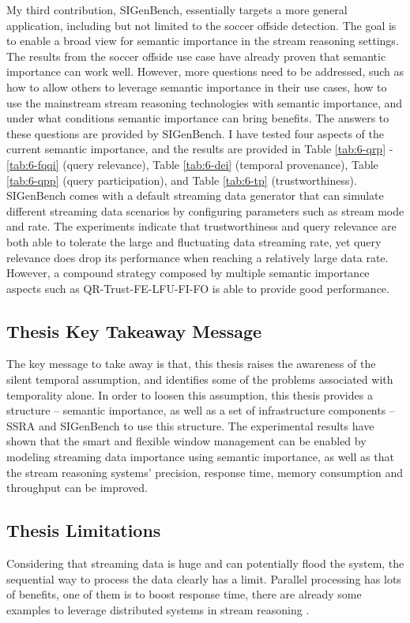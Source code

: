 My third contribution, SIGenBench, essentially targets a more general application, including but not limited to the soccer offside detection. 
The goal is to enable a broad view for semantic importance in the stream reasoning settings. 
The results from the soccer offside use case have already proven that semantic importance can work well. 
However, more questions need to be addressed, such as how to allow others to leverage semantic importance in their use cases, how to use the mainstream stream reasoning technologies with semantic importance, and under what conditions semantic importance can bring benefits. 
The answers to these questions are provided by SIGenBench. 
I have tested four aspects of the current semantic importance, and the results are provided in Table \ref{tab:6-qrp} - \ref{tab:6-fqqi} (query relevance), Table \ref{tab:6-dei} (temporal provenance), Table \ref{tab:6-qpp} (query participation), and Table \ref{tab:6-tp} (trustworthiness). 
SIGenBench comes with a default streaming data generator that can simulate different streaming data scenarios by configuring parameters such as stream mode and rate. 
The experiments indicate that trustworthiness and query relevance are both able to tolerate the large and fluctuating data streaming rate, yet query relevance does drop its performance when reaching a relatively large data rate. 
However, a compound strategy composed by multiple semantic importance aspects such as QR-Trust-FE-LFU-FI-FO is able to provide good performance.
%
\subsection{Thesis Key Takeaway Message}
The key message to take away is that, this thesis raises the awareness of the silent temporal assumption, and identifies some of the problems associated with temporality alone.
In order to loosen this assumption, this thesis provides a structure -- semantic importance, as well as a set of infrastructure components -- SSRA and SIGenBench to use this structure. 
The experimental results have shown that the smart and flexible window management can be enabled by modeling streaming data importance using semantic importance, as well as that the stream reasoning systems' precision, response time, memory consumption and throughput can be improved.
%
\subsection{Thesis Limitations}
Considering that streaming data is huge and can potentially flood the system, the sequential way to process the data clearly has a limit. 
Parallel processing has lots of benefits, one of them is to boost response time, there are already some examples to leverage distributed systems in stream reasoning \cite{hoeksema2011high} \cite{liu2014efficient}. 

